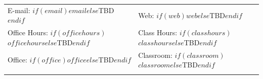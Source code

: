 %
%
%
%
\noindent\begin{tabularx}{\textwidth}{@{}>{\raggedright\arraybackslash}X >{\raggedleft\arraybackslash}X@{}}
E-mail: $if(email)$\texttt{$email$}$else$TBD$endif$ &
  Web: $if(web)$\href{https://$web$}{\texttt{$web$}}$else$TBD$endif$ \\
Office Hours: $if(officehours)$$officehours$$else$TBD$endif$ &
  Class Hours: $if(classhours)$$classhours$$else$TBD$endif$ \\
Office: $if(office)$$office$$else$TBD$endif$ &
  Classroom: $if(classroom)$$classroom$$else$TBD$endif$ \\
 & \\
\hline
\end{tabularx}

\vspace{2mm}

